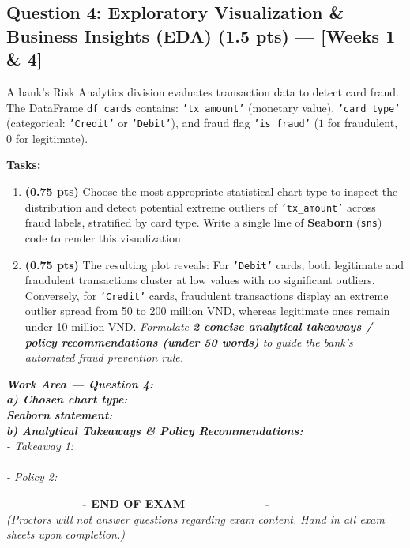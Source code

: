 \documentclass[11pt,a4paper]{article}
\newcommand{\answerbox}[2]{
  \vspace{1mm}
  \begin{tcolorbox}[
    colback=white,
    colframe=gray!60,
    boxrule=0.6pt,
    arc=2pt,
    height=#1,
    left=3mm, right=3mm, top=2mm, bottom=2mm
  ]
  \small\textit{\color{gray}#2}
  \end{tcolorbox}
  \vspace{1mm}
}
\begin{document}
\subsection*{Question 4: Exploratory Visualization \& Business Insights (EDA) (1.5 pts) --- [Weeks 1 \& 4]}
A bank's Risk Analytics division evaluates transaction data to detect card fraud. The DataFrame \texttt{df\_cards} contains: \texttt{'tx\_amount'} (monetary value), \texttt{'card\_type'} (categorical: \texttt{'Credit'} or \texttt{'Debit'}), and fraud flag \texttt{'is\_fraud'} ($1$ for fraudulent, $0$ for legitimate).

\noindent
\textbf{Tasks:}
\begin{enumerate}[label=\textbf{\alph*)}]
  \item \textbf{(0.75 pts)} Choose the most appropriate statistical chart type to inspect the distribution and detect potential extreme outliers of \texttt{'tx\_amount'} across fraud labels, stratified by card type. Write a single line of \textbf{Seaborn} (\texttt{sns}) code to render this visualization.
  \item \textbf{(0.75 pts)} The resulting plot reveals: For \texttt{'Debit'} cards, both legitimate and fraudulent transactions cluster at low values with no significant outliers. Conversely, for \texttt{'Credit'} cards, fraudulent transactions display an extreme outlier spread from 50 to 200 million VND, whereas legitimate ones remain under 10 million VND.  
  \textit{Formulate \textbf{2 concise analytical takeaways / policy recommendations (under 50 words)} to guide the bank's automated fraud prevention rule.}
\end{enumerate}

\answerbox{5.0cm}{
\textbf{Work Area --- Question 4:}\\[1.5mm]
\textbf{a) Chosen chart type:} \dotfill\\[2mm]
\textbf{Seaborn statement:} \dotfill\\[3mm]
\textbf{b) Analytical Takeaways \& Policy Recommendations:}\\
- Takeaway 1: \dotfill\\[2mm]
\hspace*{2.2cm}\dotfill\\[2mm]
- Policy 2: \dotfill\\[2mm]
\hspace*{2.2cm}\dotfill
}

\vspace{1mm}
\begin{center}
\textbf{------------------- END OF EXAM -------------------}\\
\textit{\small (Proctors will not answer questions regarding exam content. Hand in all exam sheets upon completion.)}
\end{center}
\end{document}
